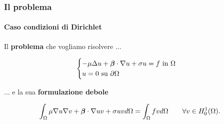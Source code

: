\begin{frame}
 \frametitle{Il problema}
 \framesubtitle{Caso condizioni di Dirichlet}
 Il \textbf{problema} che vogliamo risolvere ...
 \begin{exampleblock}{}
 \begin{equation}
  \begin{cases}
   -\mu\Delta u + \boldsymbol{\beta}\cdot \nabla u +\sigma u = f\text{ in }\Omega\\
   u=0\text{ su }\partial{\Omega}
  \end{cases}
 \end{equation}
 \end{exampleblock}
 ... e la sua \textbf{formulazione debole}
 \begin{exampleblock}{}
 \begin{equation}
  \int_{\Omega} \mu\nabla u \nabla v +\boldsymbol{\beta}\cdot \nabla uv + \sigma uv d\Omega=\int_{\Omega}fv d\Omega\qquad\forall v \in H^1_0(\Omega).
 \end{equation}
 \end{exampleblock}


\end{frame}


